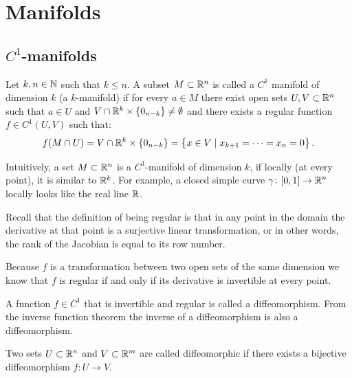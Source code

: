 \documentclass[11pt,a4paper]{article}
\begin{document}
\newpage

\section{Manifolds}
\subsection{\texorpdfstring{$C^1$}{C}-manifolds}
\begin{definition}[$C^1$-manifold]
  Let $k,n \in \mathbb{N}$ such that $k \le n$. A subset $M \subset \mathbb{R}^n$
  is called a $C^1$ manifold of dimension $k$ (a $k$-manifold)
  if for every $a \in M$ there exist open sets $U,V \subset \mathbb{R}^n$ such that
  $a \in U$ and $V \cap \mathbb{R}^k \times \{0_{n-k}\} \neq \emptyset$ and 
  there exists a regular function $f \in C^1(U,V)$ such that:
  \[
    f(M \cap U) =
    V \cap \mathbb{R}^k \times \left\{0_{n-k}\right\} =
    \left\{x \in V \mid x_{k+1} = \cdots = x_n = 0\right\}.
  \]
\end{definition}

\begin{remark}
  Intuitively,
  a set $M \subset \mathbb{R}^n$ is a $C^1$-manifold of dimension $k$,
  if locally (at every point), it is similar to $\mathbb{R}^k$.
  For example, a closed simple curve $\gamma \colon [0,1] \to \mathbb{R}^n$
  locally looks like the real line $\mathbb{R}$.
\end{remark}

\begin{remark}
  Recall that the definition of being regular is that in any point in
  the domain the derivative at that point is a surjective linear
  transformation, or in other words,
  the rank of the Jacobian is equal to its row number.
\end{remark}

\begin{remark}
  Because $f$ is a transformation between two open sets of the same
  dimension we know that $f$ is regular if and only if its derivative
  is invertible at every point.
\end{remark}

\begin{definition}[Diffeomorphism]
  A function $f \in C^1$ that is invertible and regular is called
  a diffeomorphism.
  From the inverse function theorem the inverse of a diffeomorphism 
  is also a diffeomorphism.
\end{definition}
\begin{definition}
  Two sets $U \subset \mathbb{R}^n$ and $V \subset \mathbb{R}^m$ are called
  diffeomorphic if there exists a bijective diffeomorphism
  $f \colon U \to V$.
\end{definition}
\end{document}
